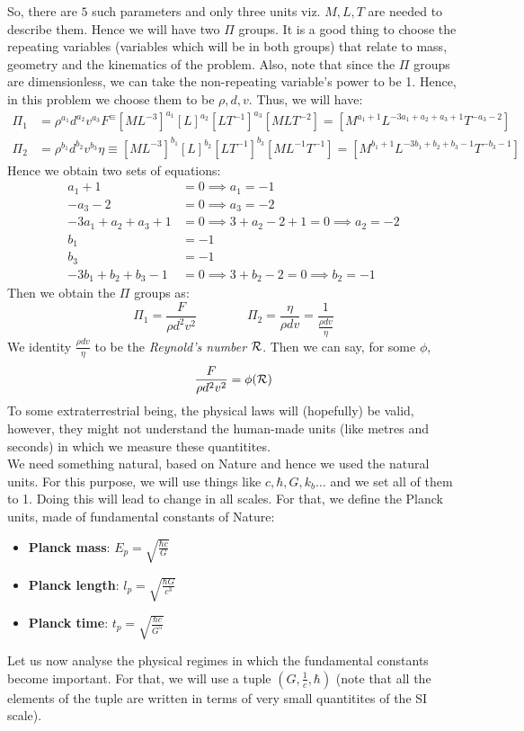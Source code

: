 So, there are $5$ such parameters and only three units viz. $M,L,T$ are needed to describe them. Hence we will have two $\Pi$ groups. It is a good thing to choose the repeating variables (variables which will be in both groups) that relate to mass, geometry and the kinematics of the problem. Also, note that since the $\Pi$ groups are dimensionless, we can take the non-repeating variable's power to be 1. Hence, in this problem we choose them to be $\rho, d, v$. Thus, we will have:
\begin{align*}
    \Pi_1 &= \rho^{a_1}d^{a_2}v^{a_3}F^\equiv [ML^{-3}]^{a_1}[L]^{a_2}[LT^{-1}]^{a_3}[MLT^{-2}] =[M^{a_1+1}L^{-3a_1+a_2+a_3+1}T^{-a_3 -2}]\\
    \Pi_2 &= \rho^{b_1}d^{b_2}v^{b_3}\eta\equiv [ML^{-3}]^{b_1}[L]^{b_2}[LT^{-1}]^{b_3} [ML^{-1}T^{-1}]=[M^{b_1+1}L^{-3b_1 + b_2+b_3-1}T^{-b_3-1}]
\end{align*}
Hence we obtain two sets of equations: 
\begin{align*}
    a_1 +1 &=0 \implies a_1 = -1\\
-a_3-2 &=0 \implies a_3 = -2\\
-3a_1+a_2+a_3 +1 &=0\implies  3 +a_2 -2+1 =0 \implies a_2 = -2\\
    b_1 &=-1\\
    b_3 &= -1\\
    -3b_1 + b_2+b_3-1 &=0\implies  3 + b_2 -2 = 0\implies b_2 = -1
\end{align*}
Then we obtain the $\Pi$ groups as: 
$$\Pi_1 = \frac{F}{\rho d^2v^2}\qquad\qquad \Pi_2 = \frac{\eta}{\rho d v} = \frac{1}{\frac{\rho d v}{\eta}}$$
We identity $\frac{\rho d v}{\eta}$ to be the \textit{Reynold's number} $\mathcal R$. Then we can say, for some $\phi$, $$\frac{F}{\rho d^2v^2} = \phi(\mathcal R)$$ 
To some extraterrestrial being, the physical laws will (hopefully) be valid, however, they might not understand the human-made units (like metres and seconds) in which we measure these quantitites.\\[0.2cm] We need something natural, based on Nature and hence we used the natural units. For this purpose, we will use things like $c,\hbar,G,k_b\ldots$ and we set all of them to 1. Doing this will lead to change in all scales. For that, we define the Planck units, made of fundamental constants of Nature:
\begin{itemize}
    \item \textbf{Planck mass}: $E_p = \sqrt{\frac{\hbar c}{G}}$
     \item \textbf{Planck length}: $l_p = \sqrt{\frac{\hbar G}{c^3}}$
     \item \textbf{Planck time}: $t_p = \sqrt{\frac{\hbar c}{G^5}}$
\end{itemize}
Let us now analyse the physical regimes in which the fundamental constants become important. For that, we will use a tuple $(G,\frac{1}{c}, \hbar)$ (note that all the elements of the tuple are written in terms of very small quantitites of the SI scale).

